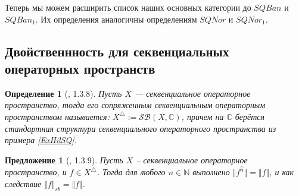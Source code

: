 \documentclass[12pt]{article}
\newtheorem{proposition}[theorem]{Предложение}
\newtheorem{definition}[theorem]{Определение}
\begin{document}
Теперь мы можем расширить список наших основных категории до $SQBan$ и $SQBan_1$. Их определения аналогичны определениям $SQNor$ и $SQNor_1$.












































\subsection{Двойственнность для секвенциальных операторных пространств}

\begin{definition}[\cite{LamOpFolgen}, 1.3.8]\label{DeffSQDual} 
Пусть $X$ --- секвенциальное операторное пространство, тогда его сопряженным секвенциальным операторным пространством называется: $X^\triangle := \mathcal{SB}(X, \mathbb{C})$, причем на $\mathbb{C}$ берётся стандартная структура секвенциального операторного пространства из примера \ref{ExHilSQ}. 
\end{definition}

\begin{proposition}[\cite{LamOpFolgen}, 1.3.9]\label{PrEveryLinFuncIsSQBounded}
Пусть $X$ -- секвенциальное операторное пространство, и $f\in X^\triangle$. Тогда для любого $n\in\mathbb{N}$ выполнено $\Vert f^{\wideparen{n}}\Vert=\Vert f\Vert$, и как следствие $\Vert f\Vert_{sb}=\Vert f\Vert$.
\end{proposition}
\end{document}
